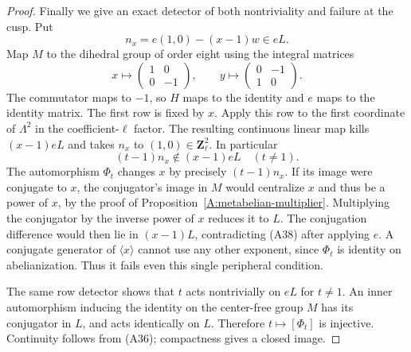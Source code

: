 \begin{proof}
Finally we give an exact detector of both nontriviality
and failure at the cusp. Put
\[
                    n_x=e(1,0)-(x-1)w\in eL.
\]
Map $M$ to the dihedral group of order eight using
the integral matrices
\[
 x\longmapsto\begin{pmatrix}1&0\\0&-1\end{pmatrix},
 \qquad
 y\longmapsto\begin{pmatrix}0&-1\\1&0\end{pmatrix}.
\]
The commutator maps to $-1$, so $H$ maps to the
identity and $e$ maps to the identity matrix.
The first row is fixed by $x$. Apply this row to
the first coordinate of $\Lambda^2$ in the
coefficient-$\ell$ factor. The resulting continuous
linear map kills $(x-1)eL$ and takes $n_x$ to
$(1,0)\in\mathbf Z_\ell^2$. In particular
\[
          (t-1)n_x\notin(x-1)eL\quad(t\ne1).               \tag{A38}
\]
The automorphism $\Phi_t$ changes $x$ by precisely
$(t-1)n_x$. If its image were conjugate to $x$, the
conjugator's image in $M$ would centralize $x$ and
thus be a power of $x$, by the proof of
Proposition~\ref{A:metabelian-multiplier}. Multiplying
the conjugator by the inverse power of $x$ reduces
it to $L$. The conjugation difference would then
lie in $(x-1)L$, contradicting (A38) after applying
$e$. A conjugate generator of $\langle x\rangle$
cannot use any other exponent, since $\Phi_t$ is
identity on abelianization. Thus it fails even this
single peripheral condition.

The same row detector shows that $t$ acts nontrivially
on $eL$ for $t\ne1$. An inner automorphism inducing
the identity on the center-free group $M$ has its
conjugator in $L$, and acts identically on $L$.
Therefore $t\mapsto[\Phi_t]$ is injective.
Continuity follows from (A36); compactness gives
a closed image.
\end{proof}

